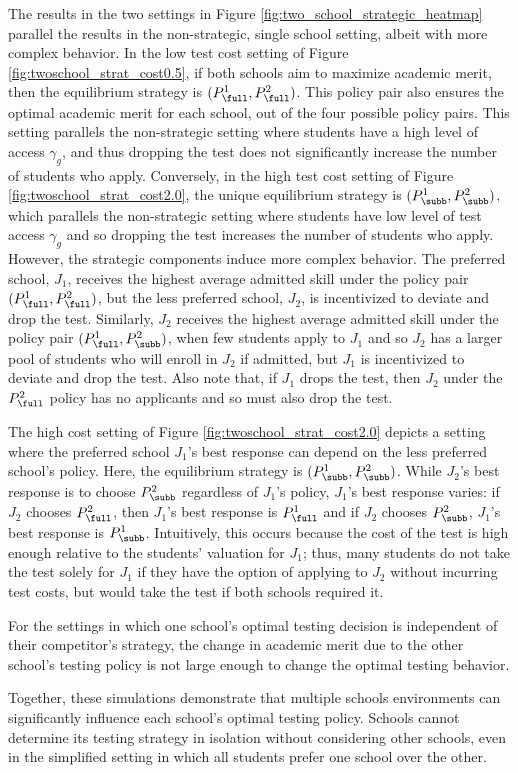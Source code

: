 {The results in the two settings in Figure \ref{fig:two_school_strategic_heatmap} parallel the results in the non-strategic, single school setting, albeit with more complex behavior. In the low test cost setting of Figure \ref{fig:twoschool_strat_cost0.5},
if both schools aim to maximize academic merit, then the equilibrium strategy is $(P^1_{\full}, P^2_{\full})$. This policy pair also ensures the optimal academic merit for each school, out of the four possible policy pairs. This setting parallels the non-strategic setting where students have a high level of access $\gamma_g$, and thus dropping the test does not significantly increase the number of students who apply. Conversely, in the high test cost setting of Figure \ref{fig:twoschool_strat_cost2.0}, the unique equilibrium strategy is $(P^1_{\subb}, P^2_{\subb})$, which parallels the non-strategic setting where students have low level of test access $\gamma_g$ and so dropping the test increases the number of students who apply. However, the strategic components induce more complex behavior. The preferred school, $J_1$, receives the highest average admitted skill under the policy pair $(P^1_{\full}, P^2_{\full})$, but the less preferred school, $J_2$, is incentivized to deviate and drop the test. Similarly, $J_2$ receives the highest average admitted skill under the policy pair $(P^1_{\full}, P^2_{\subb})$, when few students apply to $J_1$ and so $J_2$ has a larger pool of students who will enroll in $J_2$ if admitted, but $J_1$ is incentivized to deviate and drop the test. Also note that, if $J_1$ drops the test, then $J_2$ under the $P^2_{\full}$ policy has no applicants and so must also drop the test.}



The high cost setting of Figure \ref{fig:twoschool_strat_cost2.0}
depicts a setting where the preferred school $J_1$'s best response can depend on the less preferred school's policy.
Here, the equilibrium strategy is $(P^1_{\subb}, P^2_{\subb})$. While $J_2$'s best response is to choose $P^2_{\subb}$ regardless of $J_1$'s policy, $J_1$'s best response varies: if $J_2$ chooses $P^2_{\full}$, then $J_1$'s best response is $P^1_{\full}$ and if $J_2$ chooses $P^2_{\subb}$, $J_1$'s best response is $P^1_{\subb}$.
Intuitively, this occurs because the cost of the test is high enough relative to the students' valuation for $J_1$; thus, many students do not take the test solely for $J_1$ if they have the option of applying to $J_2$ without incurring test costs, but would take the test if both schools required it.


For the settings in which one school's optimal testing decision is independent of their competitor's strategy, the change in academic merit due to the other school's testing policy is not large enough to change the optimal testing behavior.

Together, these simulations demonstrate that multiple schools environments can significantly influence each school's optimal testing policy. Schools cannot determine its testing strategy in isolation without considering other schools, even in the simplified setting in which all students prefer one school over the other.
